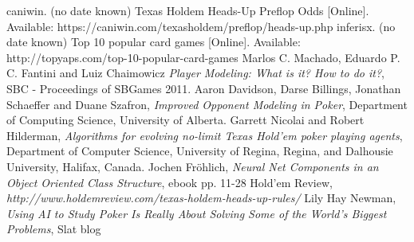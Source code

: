 \begin{thebibliography}{100} 
 caniwin. (no date known) Texas Holdem Heads-Up Preflop Odds [Online]. Available: https://caniwin.com/texasholdem/preflop/heads-up.php
 inferisx. (no date known) Top 10 popular card games [Online]. Available: http://topyaps.com/top-10-popular-card-games
 Marlos C. Machado, Eduardo P. C. Fantini and Luiz Chaimowicz \emph{Player Modeling: What is it? How to do it?}, SBC - Proceedings of SBGames 2011.
 Aaron Davidson, Darse Billings, Jonathan Schaeffer and Duane Szafron, \emph{Improved Opponent Modeling in Poker},
Department of Computing Science, University of Alberta.
 Garrett Nicolai and Robert Hilderman, \emph{Algorithms for evolving no-limit Texas Hold'em poker playing agents}, Department of Computer Science, University of Regina, Regina, and Dalhousie University, Halifax, Canada.
 Jochen Fröhlich, \emph {Neural Net Components in an Object Oriented Class Structure}, 
ebook pp. 11-28
 Hold'em Review, \emph {http://www.holdemreview.com/texas-holdem-heads-up-rules/}
 Lily Hay Newman, \emph{Using AI to Study Poker Is Really About Solving Some of the World’s Biggest Problems}, 
Slat blog
\end{thebibliography}